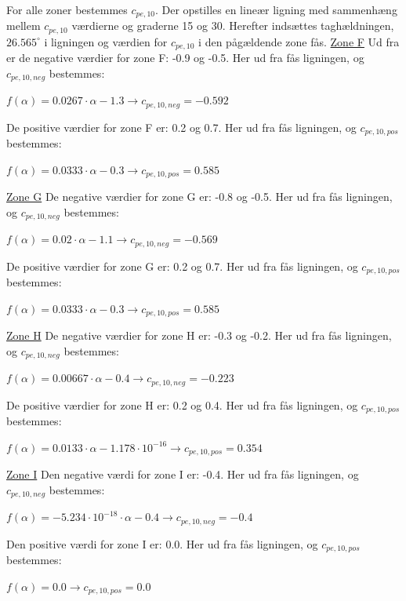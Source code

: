 For alle zoner bestemmes $c_{pe,10}$. Der opstilles en lineær ligning med sammenhæng mellem $c_{pe,10}$ værdierne og graderne 15 og 30. Herefter indsættes taghældningen, $26.565^{\circ}$ i ligningen og værdien for $c_{pe,10}$ i den pågældende zone fås.
\newline
\newline
\underline{Zone F}
\newline
Ud fra \citep[ tabel 7.4a kapitel 7.2.5]{EU91} er de negative værdier for zone F: -0.9 og -0.5. Her ud fra fås ligningen, og $c_{pe,10,neg}$ bestemmes:
\begin{center}
	$f(\alpha)=0.0267\cdot \alpha - 1.3 \to c_{pe,10,neg}=-0.592$
\end{center}
De positive værdier for zone F er: 0.2 og 0.7. Her ud fra fås ligningen, og $c_{pe,10,pos}$ bestemmes:
\begin{center}
	$f(\alpha)=0.0333\cdot \alpha - 0.3 \to c_{pe,10,pos}=0.585$
\end{center}

\underline{Zone G}
\newline
De negative værdier for zone G er: -0.8 og -0.5. Her ud fra fås ligningen, og $c_{pe,10,neg}$ bestemmes:
\begin{center}
	$f(\alpha)=0.02\cdot \alpha - 1.1 \to c_{pe,10,neg}=-0.569$
\end{center}
De positive værdier for zone G er: 0.2 og 0.7. Her ud fra fås ligningen, og $c_{pe,10,pos}$ bestemmes:
\begin{center}
	$f(\alpha)=0.0333\cdot \alpha - 0.3 \to c_{pe,10,pos}=0.585$
\end{center}

\underline{Zone H}
\newline
De negative værdier for zone H er: -0.3 og -0.2. Her ud fra fås ligningen, og $c_{pe,10,neg}$ bestemmes:
\begin{center}
	$f(\alpha)=0.00667\cdot \alpha - 0.4 \to c_{pe,10,neg}=-0.223$
\end{center}
De positive værdier for zone H er: 0.2 og 0.4. Her ud fra fås ligningen, og $c_{pe,10,pos}$ bestemmes:
\begin{center}
	$f(\alpha)=0.0133\cdot \alpha - 1.178\cdot 10^{-16} \to c_{pe,10,pos}=0.354$
\end{center}

\underline{Zone I}
\newline
Den negative værdi for zone I er: -0.4. Her ud fra fås ligningen, og $c_{pe,10,neg}$ bestemmes:
\begin{center}
	$f(\alpha)=-5.234\cdot 10^{-18}\cdot \alpha - 0.4 \to c_{pe,10,neg}=-0.4$
\end{center}
Den positive værdi for zone I er: 0.0. Her ud fra fås ligningen, og $c_{pe,10,pos}$ bestemmes:
\begin{center}
	$f(\alpha)=0.0 \to c_{pe,10,pos}=0.0$
\end{center}

